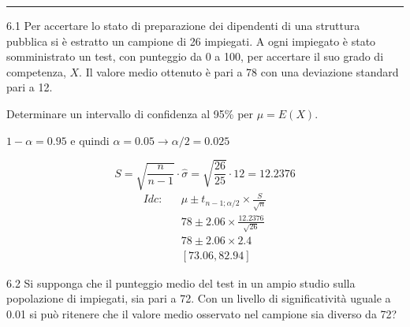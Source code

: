\documentclass[
  11pt,
]{book}
\theoremstyle{mytheoremstyle}
\theoremstyle{mydefstyle}
\newenvironment{sol}
  {
  \begin{tcolorbox}[enhanced,breakable,arc=0.1mm,boxrule=1pt,colback=white,colframe=iblue,
  title=\bf \fontfamily{lmss}\selectfont \hspace{.5 cm} Soluzione,drop fuzzy shadow]

}{
\end{tcolorbox}
  }
\begin{document}
\begin{center}\rule{0.5\linewidth}{0.5pt}\end{center}

6.1 Per accertare lo stato di preparazione dei dipendenti di una
struttura pubblica si è estratto un campione di 26 impiegati.
A ogni impiegato è stato somministrato un test, con
punteggio da 0 a 100, per accertare il suo grado di competenza, \(X\).
Il valore medio ottenuto è pari a 78 con una deviazione
standard pari a 12.

Determinare un intervallo di confidenza
al 95\% per \(\mu = E(X)\).

\begin{sol}
\(1-\alpha =0.95\) e quindi \(\alpha=0.05\rightarrow \alpha/2=0.025\)

\[
      S  =\sqrt{\frac {n}{n-1}}\cdot\hat\sigma =
     \sqrt{\frac { 26 }{ 25 }}\cdot 12 = 12.2376 
\]
\begin{eqnarray*}
  Idc: & &  \hat\mu \pm  t_{n-1;\alpha/2} \times \frac{S}{\sqrt{n}} \\
     & &  78 \pm  2.06 \times \frac{ 12.2376 }{\sqrt{ 26 }} \\
     & &  78 \pm  2.06 \times  2.4 \\
     & & [ 73.06 ,  82.94 ]
\end{eqnarray*}

\end{sol}

6.2 Si supponga che il punteggio medio del test in un ampio
studio sulla popolazione di impiegati, sia pari a 72.
Con un livello di significatività uguale a 0.01 si può
ritenere che il valore medio osservato nel campione sia
diverso da 72?
\end{document}
